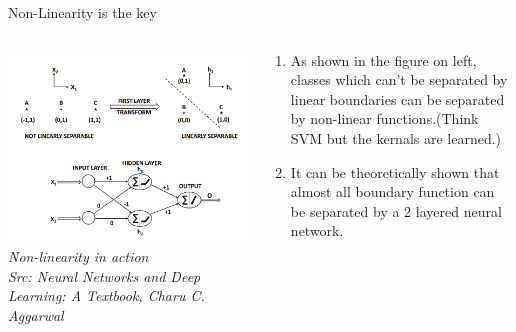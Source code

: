 \begin{frame}{Non-Linearity is the key}
  \begin{columns}[T]
  \begin{column}{0.4\textwidth}
	\includegraphics[width=\textwidth]{images/non-linearity.png}
	\tiny{\textit{Non-linearity in action\\ Src: Neural Networks and Deep Learning: A Textbook, Charu C. Aggarwal}}
  \end{column}
  \begin{column}{0.6\textwidth}
  \begin{enumerate}[$\bullet$]
  \item As shown in the figure on left, classes which can't be separated by linear boundaries can be separated by non-linear functions.(Think SVM but the kernals are learned.)\pause
  \item It can be theoretically shown that almost all boundary function can be separated by a 2 layered neural network.
  \end{enumerate}
  \end{column}
\end{columns}
\end{frame}



